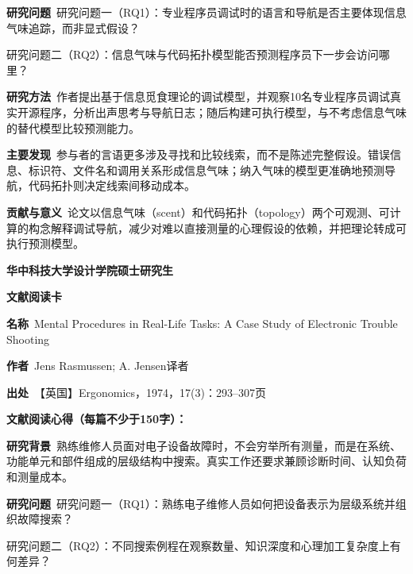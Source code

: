 \noindent\textbf{研究问题}\ 研究问题一（RQ1）：专业程序员调试时的语言和导航是否主要体现信息气味追踪，而非显式假设？\par
研究问题二（RQ2）：信息气味与代码拓扑模型能否预测程序员下一步会访问哪里？\par
\noindent\textbf{研究方法}\ 作者提出基于信息觅食理论的调试模型，并观察10名专业程序员调试真实开源程序，分析出声思考与导航日志；随后构建可执行模型，与不考虑信息气味的替代模型比较预测能力。\par
\noindent\textbf{主要发现}\ 参与者的言语更多涉及寻找和比较线索，而不是陈述完整假设。错误信息、标识符、文件名和调用关系形成信息气味；纳入气味的模型更准确地预测导航，代码拓扑则决定线索间移动成本。\par
\noindent\textbf{贡献与意义}\ 论文以信息气味（scent）和代码拓扑（topology）两个可观测、可计算的构念解释调试导航，减少对难以直接测量的心理假设的依赖，并把理论转成可执行预测模型。\par
\clearpage
\begin{center}
{\songti\bfseries\fontsize{18.5pt}{27.75pt}\selectfont 华中科技大学设计学院硕士研究生\par}
{\songti\bfseries\fontsize{18.5pt}{27.75pt}\selectfont 文献阅读卡\par}
\end{center}
\vspace{0.25em}
\noindent\underline{}\par
\vspace{0.35em}
\noindent\textbf{名称}\ Mental Procedures in Real-Life Tasks: A Case Study of Electronic Trouble Shooting\par
\noindent\textbf{作者}\ Jens Rasmussen; A. Jensen\quad 译者\par
\noindent\textbf{出处}\ 【英国】Ergonomics，1974，17(3)：293–307\quad 页\par
\vspace{0.35em}
\noindent\textbf{文献阅读心得（每篇不少于150字）：}\par
\noindent\textbf{研究背景}\ 熟练维修人员面对电子设备故障时，不会穷举所有测量，而是在系统、功能单元和部件组成的层级结构中搜索。真实工作还要求兼顾诊断时间、认知负荷和测量成本。\par
\noindent\textbf{研究问题}\ 研究问题一（RQ1）：熟练电子维修人员如何把设备表示为层级系统并组织故障搜索？\par
研究问题二（RQ2）：不同搜索例程在观察数量、知识深度和心理加工复杂度上有何差异？\par
